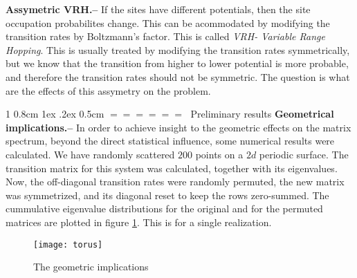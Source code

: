 \documentclass[onecolumn,fleqn,notitlepage,secnumarabic]{revtex4}
\makeatletter
\def\section{%
  \@startsection
    {section}%
    {1}%
    {\z@}%
    {0.8cm \@plus1ex \@minus .2ex}%
    {0.5cm}%
    {\Large\bf $=\!=\!=\!=\!=\!=\;$}%
}%
\makeatother
\begin{document}
{\bf Assymetric VRH.--} If the sites have different potentials, then the site occupation probabilites change. This can be acommodated by modifying the transition rates by Boltzmann's factor. This is called \emph{VRH- Variable Range Hopping}\cite{Ambegaokar:1971}. This is usually treated by modifying the transition rates symmetrically, but we know that the transition from higher to lower potential is more probable, and therefore the transition rates should not be symmetric. The question is what are the effects of this assymetry on the problem.


\section{Preliminary results} \label{sec:prelim}
{ \bf Geometrical implications.-- } In order to achieve insight to the geometric effects on the matrix spectrum, beyond the direct statistical influence, some numerical results were calculated. We have randomly scattered $200$ points on a $2d$ periodic surface. The transition matrix for this system was calculated, together with its eigenvalues. Now, the off-diagonal transition rates were randomly permuted, the new matrix was symmetrized, and its diagonal reset to keep the rows zero-summed. The cummulative eigenvalue distributions for the original and for the permuted matrices are plotted in figure \ref{fig:torus}. This is for a single realization.

\begin{figure}
    \texttt{[image: torus]}
    \caption{The geometric implications}\label{fig:torus}
\end{figure}


%

\end{document}

